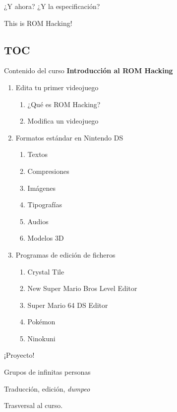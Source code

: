 \begin{frame}{¿Y ahora? ¿Y la especificación?}
\end{frame}

\begin{frame}{This is ROM Hacking!}
\end{frame}

\subsection{TOC}
\begin{frame}{Contenido del curso}
    \centering
    \textbf{Introducción al ROM Hacking}
    \begin{enumerate}
        \item Edita tu primer videojuego
        \begin{enumerate}
            \item ¿Qué es ROM Hacking?
            \item Modifica un videojuego
        \end{enumerate}
        \item Formatos estándar en Nintendo DS
        \begin{enumerate}
            \item Textos
            \item Compresiones
            \item Imágenes
            \item Tipografías
            \item Audios
            \item Modelos 3D
        \end{enumerate}
        \item Programas de edición de ficheros
        \begin{enumerate}
            \item Crystal Tile
            \item New Super Mario Bros Level Editor
            \item Super Mario 64 DS Editor
            \item Pokémon
            \item Ninokuni
        \end{enumerate}
    \end{enumerate}
\end{frame}

\begin{frame}{¡Proyecto!}
    \Large
    \begin{wideitemize}
        \item Grupos de infinitas personas
        \item Traducción, edición, \textit{dumpeo}
        \item Trasversal al curso.
    \end{wideitemize}
\end{frame}

